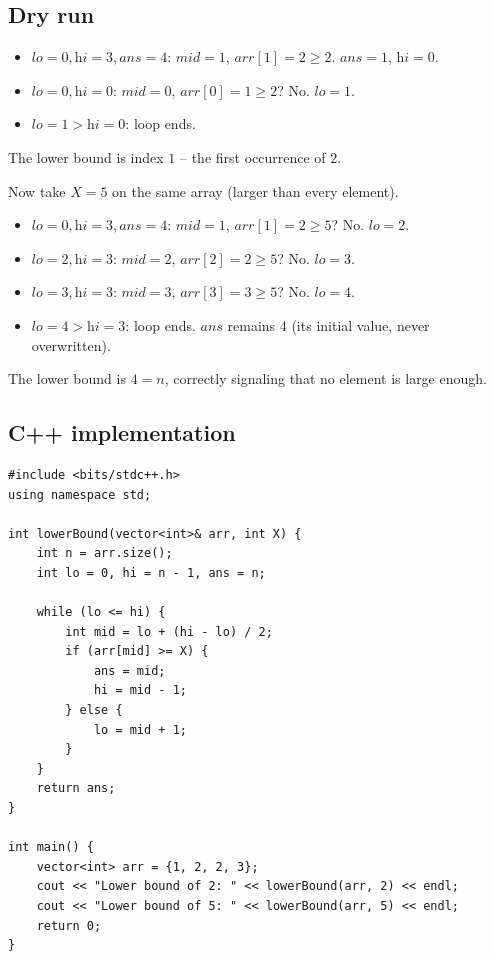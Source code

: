 \subsection*{Dry run}


\begin{itemize}
  \item $\textit{lo}=0,\textit{hi}=3,\textit{ans}=4$: $\textit{mid}=1$,
        $\textit{arr}[1]=2 \ge 2$. $\textit{ans}=1$, $\textit{hi}=0$.
  \item $\textit{lo}=0,\textit{hi}=0$: $\textit{mid}=0$,
        $\textit{arr}[0]=1 \ge 2$? No. $\textit{lo}=1$.
  \item $\textit{lo}=1 > \textit{hi}=0$: loop ends.
\end{itemize}

The lower bound is index $1$ -- the first occurrence of $2$.

Now take $X = 5$ on the same array (larger than every element).

\begin{itemize}
  \item $\textit{lo}=0,\textit{hi}=3,\textit{ans}=4$: $\textit{mid}=1$,
        $\textit{arr}[1]=2 \ge 5$? No. $\textit{lo}=2$.
  \item $\textit{lo}=2,\textit{hi}=3$: $\textit{mid}=2$,
        $\textit{arr}[2]=2 \ge 5$? No. $\textit{lo}=3$.
  \item $\textit{lo}=3,\textit{hi}=3$: $\textit{mid}=3$,
        $\textit{arr}[3]=3 \ge 5$? No. $\textit{lo}=4$.
  \item $\textit{lo}=4 > \textit{hi}=3$: loop ends. $\textit{ans}$ remains
        $4$ (its initial value, never overwritten).
\end{itemize}

The lower bound is $4 = n$, correctly signaling that no element is large
enough.

\subsection*{C++ implementation}

\begin{lstlisting}
#include <bits/stdc++.h>
using namespace std;

int lowerBound(vector<int>& arr, int X) {
    int n = arr.size();
    int lo = 0, hi = n - 1, ans = n;

    while (lo <= hi) {
        int mid = lo + (hi - lo) / 2;
        if (arr[mid] >= X) {
            ans = mid;
            hi = mid - 1;
        } else {
            lo = mid + 1;
        }
    }
    return ans;
}

int main() {
    vector<int> arr = {1, 2, 2, 3};
    cout << "Lower bound of 2: " << lowerBound(arr, 2) << endl;
    cout << "Lower bound of 5: " << lowerBound(arr, 5) << endl;
    return 0;
}
\end{lstlisting}

